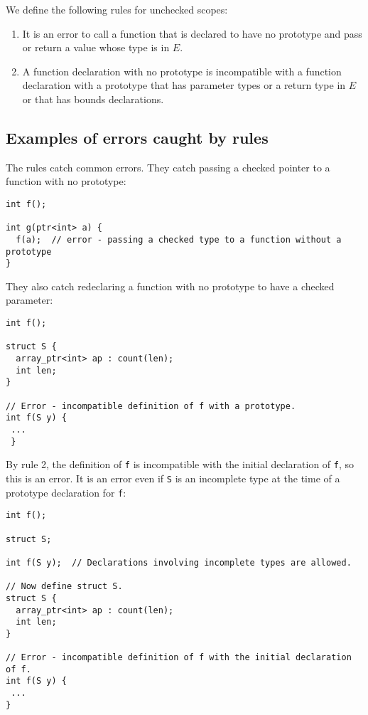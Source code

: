 We define the following rules for unchecked scopes:
\begin{enumerate}
\item It is an error to call a function that is
declared to have no prototype and pass or return a value whose type is in $E$.
\item A function declaration with no prototype is incompatible with a function declaration
with a prototype that has parameter types or a return type in $E$ or that has bounds
declarations.
\end{enumerate}

\subsection{Examples of errors caught by rules}
The rules catch common errors.  They catch passing a checked pointer
to a function with no prototype:
\begin{lstlisting}
int f();

int g(ptr<int> a) {
  f(a);  // error - passing a checked type to a function without a prototype
}
\end{lstlisting}
They also catch redeclaring a function with no prototype to have a checked parameter:
\begin{lstlisting}
int f();

struct S {
  array_ptr<int> ap : count(len);
  int len;
}

// Error - incompatible definition of f with a prototype.
int f(S y) {
 ...
 }
\end{lstlisting}
By rule 2, the definition of \lstinline+f+ is incompatible with the initial
declaration of \lstinline+f+, so this is an error.  It is an error even
if \lstinline+S+ is an incomplete type at the time of
a prototype declaration for \lstinline+f+:
\begin{lstlisting} 
int f();

struct S;

int f(S y);  // Declarations involving incomplete types are allowed.

// Now define struct S.
struct S {
  array_ptr<int> ap : count(len);
  int len;
}

// Error - incompatible definition of f with the initial declaration of f.
int f(S y) {
 ...
}
\end{lstlisting}

